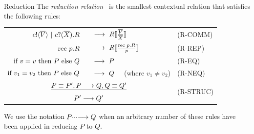 \documentclass[12pt,twoside]{reedthesis}
\begin{document}
		\begin{definition}{Reduction}
			The \emph{reduction relation} \pred\ is the smallest contextual relation that satisfies the following rules:
			\begin{center}\begin{tabular}{rll}
				${c}!\langle{ \ensuremath{\overline{V}} }\rangle \ |\  {c}?({\overline{X}}).R$\ &\  $\pred\  R\subst{\tuple{V}}{\tuple{X}}$ & \tiny{(R-COMM)}\\
				$\text{rec }{p}.R$\ &\  $\pred\  R\subst{\rec{p}R}{p}$ & \tiny{(R-REP)}\\
				$\text{if } {v = v}\text{ then } P \text{ else } Q$\ &\ $\pred\ P$ & \tiny{(R-EQ)}\\
				$\text{if } {v_1 = v_2}\text{ then } P \text{ else } Q$\ &\ $\pred\ Q$ \ \ (where $v_1\neq v_2$)& \tiny{(R-NEQ)}\\
				\multicolumn{2}{c}{\hspace{4.5em}$\underline{P\equiv P', P \longrightarrow Q, Q\equiv Q'}$} & \multirow{2}{*}{\tiny{(R-STRUC)}}\\
				\multicolumn{2}{c}{\hspace{4.5em}$P'\longrightarrow Q'$}
			\end{tabular}\end{center}
			We use the notation $P\cdotp\!\cdotp\!\cdotp\!\longrightarrow Q$ when an arbitrary number of these rules have been applied in reducing $P$ to $Q$.
		\end{definition}
		
		\newpage
		\null\vfil
	  
\end{document}
